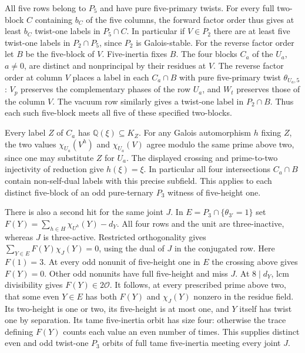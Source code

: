 \documentclass[11pt,a4paper]{article}
\numberwithin{equation}{section}
\theoremstyle{remark}
\begin{document}
All five rows belong to $P_5$ and have pure five-primary twists.
For every full two-block $C$ containing $b_C$ of the five columns,
the forward factor order thus gives at least $b_C$ twist-one labels
in $P_5\cap C$. In particular if $V\in P_2$ there are at least
five twist-one labels in $P_2\cap P_5$, since $P_2$ is Galois-stable.
For the reverse factor order let $B$ be the five-block of $V$.
Five-inertia fixes $B$. The four blocks $C_a$ of the $U_a$,
$a\ne0$, are distinct and nonprincipal by their residues at $V$.
The reverse factor order at column $V$ places a label in each
$C_a\cap B$ with pure five-primary twist $\theta_{U_a,5}$:
$V_p$ preserves the complementary phases of the row $U_a$, and
$W_t$ preserves those of the column $V$. The vacuum row similarly
gives a twist-one label in $P_2\cap B$. Thus each such five-block
meets all five of these specified two-blocks.

Every label $Z$ of $C_a$ has $\mathbb Q(\xi)\subseteq K_Z$.
For any Galois automorphism $h$ fixing $Z$, the two values
$\chi_{U_a}(V^h)$ and $\chi_{U_a}(V)$ agree modulo the same prime
above two, since one may substitute $Z$ for $U_a$. The displayed
crossing and prime-to-two injectivity of reduction give $h(\xi)=\xi$.
In particular all four intersections $C_a\cap B$ contain non-self-dual
labels with this precise subfield. This applies to each distinct five-block
of an odd pure-ternary $P_3$ witness of five-height one.

There is also a second hit for the same joint $J$. In
$E=P_3\cap\{\theta_{3'}=1\}$ set
$F(Y)=\sum_{h\in H}\chi_{U^h}(Y)-d_Y$.
All four rows and the unit are three-inactive, whereas $J$ is
three-active. Restricted orthogonality gives
$\sum_{Y\in E} F(Y)\chi_J(Y)=0$, using the dual of $J$ in the conjugated row.
Here $F(1)=3$. At every odd nonunit of five-height one in $E$
the crossing above gives $F(Y)=0$. Other odd nonunits have full
five-height and miss $J$. At $8\mid d_Y$, lcm divisibility gives
$F(Y)\in2\mathcal O$. It follows, at every prescribed prime above
two, that some even $Y\in E$ has both $F(Y)$ and
$\chi_J(Y)$ nonzero in the residue field. Its two-height
is one or two, its five-height is at most one, and $Y$ itself
has twist one by separation. Its tame five-inertia orbit has
size four: otherwise the trace defining $F(Y)$ counts each value
an even number of times. This supplies distinct even and odd
twist-one $P_3$ orbits of full tame five-inertia meeting every joint $J$.
\end{document}
